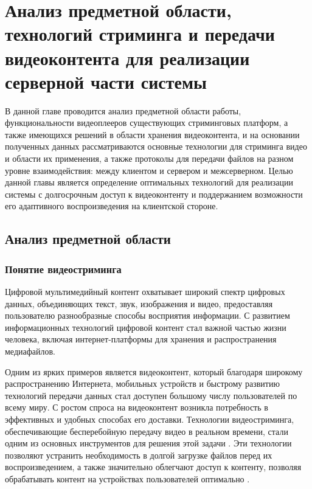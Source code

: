 \chapter{Анализ предметной области, технологий стриминга и передачи видеоконтента для реализации серверной части системы} \label{ch1}


	В данной главе проводится анализ предметной области работы, функциональности видеоплееров существующих стриминговых платформ, а также имеющихся решений в области хранения видеоконтента, и на основании полученных данных рассматриваются основные технологии для стриминга видео и области их применения, а также протоколы для передачи файлов на разном уровне взаимодействия: между клиентом и сервером и межсерверном. Целью данной главы является определение оптимальных технологий для реализации системы с долгосрочным доступ к видеоконтенту и поддержанием возможности его адаптивного воспроизведения на клиентской стороне.

\section{Анализ предметной области}

\subsection{Понятие видеостриминга}

	Цифровой мультимедийный контент охватывает широкий спектр цифровых данных, объединяющих текст, звук, изображения и видео, предоставляя пользователю разнообразные способы восприятия информации. С развитием информационных технологий цифровой контент стал важной частью жизни человека, включая интернет-платформы для хранения и распространения медиафайлов.

	Одним из ярких примеров является видеоконтент, который благодаря широкому распространению Интернета, мобильных устройств и быстрому развитию технологий передачи данных стал доступен большому числу пользователей по всему миру. С ростом спроса на видеоконтент возникла потребность в эффективных и удобных способах его доставки. Технологии видеостриминга, обеспечивающие бесперебойную передачу видео в реальном времени, стали одним из основных инструментов для решения этой задачи \cite{apostolopoulosVideoStreaming}. Эти технологии позволяют устранить необходимость в долгой загрузке файлов перед их воспроизведением, а также значительно облегчают доступ к контенту, позволяя обрабатывать контент на устройствах пользователей оптимально \cite{korotkovaMultimediaCommunication}.

